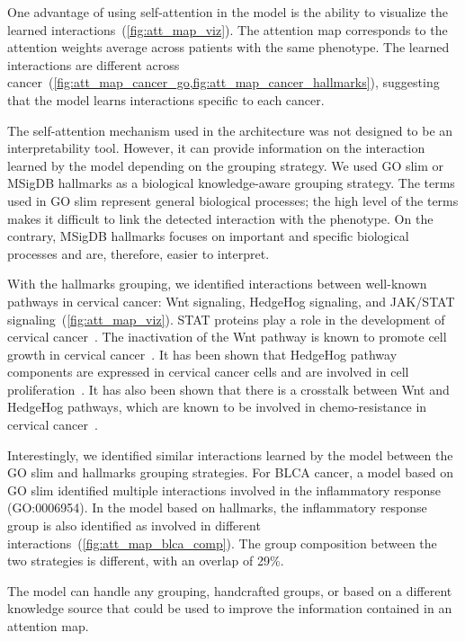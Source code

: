 \documentclass[../main.tex]{subfiles}
\begin{document}
		One advantage of using self-attention in the model is the ability to visualize the learned interactions~(\cref{fig:att_map_viz}).
		The attention map corresponds to the attention weights average across patients with the same phenotype.
		The learned interactions are different across cancer~(\cref{fig:att_map_cancer_go,fig:att_map_cancer_hallmarks}), suggesting that the model learns interactions specific to each cancer.

		The self-attention mechanism used in the architecture was not designed to be an interpretability tool.
		However, it can provide information on the interaction learned by the model depending on the grouping strategy.
		We used GO slim or MSigDB hallmarks as a biological knowledge-aware grouping strategy.
		The terms used in GO slim represent general biological processes; the high level of the terms makes it difficult to link the detected interaction with the phenotype.
		On the contrary, MSigDB hallmarks focuses on important and specific biological processes and  are, therefore, easier to interpret.


		With the hallmarks grouping, we identified interactions between well-known pathways in cervical cancer: Wnt signaling, HedgeHog signaling, and JAK/STAT signaling~(\cref{fig:att_map_viz}).
		STAT proteins play a role in the development of cervical cancer~\cite{gutierrez-hoyaRoleJAKSTAT2020}.
		The inactivation of the Wnt pathway is known to promote cell growth in cervical cancer~\cite{yangWntSignalingCervical2018}.
		It has been shown that HedgeHog pathway components are expressed in cervical cancer cells and are involved in cell proliferation~\cite{samarzijaHedgehogPathwayRegulators2012}.
		It has also been shown that there is a crosstalk between Wnt and HedgeHog pathways, which are known to be involved in chemo-resistance in cervical cancer~\cite{kumarRoleNotchHedgehog2021}.


		Interestingly, we identified similar interactions learned by the model between the GO slim and hallmarks grouping strategies.
		For BLCA cancer, a model based on GO slim identified multiple interactions involved in the inflammatory response (GO:0006954).
		In the model based on hallmarks, the inflammatory response group is also identified as involved in different interactions~(\cref{fig:att_map_blca_comp}).
		The group composition between the two strategies is different, with an overlap of 29\%.


		The model can handle any grouping, handcrafted groups, or based on a different knowledge source that could be used to improve the information contained in an attention map.
\end{document}
